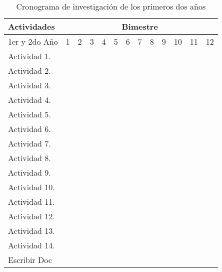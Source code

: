 \begin{table}[!htb]
  \centering
  \newcommand{\Bk}{\multicolumn{1}{G}{ }}
  \begin{tabular}{|p{3.0cm}||c|c|c|c|c|c|c|c|c|c|c|c|}\hline
    Actividades&\multicolumn{12}{|c|}{Bimestre}\\\hline\hline
    1er y  2do A\~no&1&2 &3  &4  &5  &6  &7  &8  &9  &10 &11 &12 \\\hline
    Actividad 1. &\Bk&   &   &   &   &\Bk&   &   &   &\Bk&   &   \\\hline
    Actividad 2. &\Bk&\Bk&   &   &\Bk&\Bk&   &\Bk&\Bk&\Bk&\Bk&\Bk\\\hline
    Actividad 3. &   &\Bk&   &   &\Bk&\Bk&   &\Bk&\Bk&\Bk&\Bk&\Bk\\\hline
    Actividad 4. &   &\Bk&   &   &   &\Bk&\Bk&\Bk&\Bk&\Bk&\Bk&\Bk\\\hline
    Actividad 5. &\Bk&   &   &\Bk&   &\Bk&   &   &   &\Bk&   &   \\\hline
    Actividad 6. &\Bk&   &   &\Bk&   &\Bk&   &   &   &\Bk&   &   \\\hline
    Actividad 7. &   &   &\Bk&\Bk&\Bk&   &\Bk&\Bk&\Bk&   &\Bk&\Bk\\\hline
    Actividad 8. &   &\Bk&   &\Bk&   &\Bk&   &   &   &\Bk&   &   \\\hline
    Actividad 9. &   &   &   &\Bk&   &   &\Bk&\Bk&\Bk&   &\Bk&\Bk\\\hline
    Actividad 10.&   &   &\Bk&\Bk&\Bk&   &\Bk&\Bk&\Bk&   &\Bk&\Bk\\\hline
    Actividad 11.&   &   &\Bk&\Bk&\Bk&   &\Bk&\Bk&\Bk&   &\Bk&\Bk\\\hline
    Actividad 12.&   &   &   &   &\Bk&   &   &\Bk&\Bk&   &\Bk&\Bk\\\hline
    Actividad 13.&   &   &   &   &   &   &   &   &   &   &   &   \\\hline
    Actividad 14.&   &   &   &   &   &   &   &   &   &   &   &   \\\hline
    Escribir Doc &   &\Bk&   &\Bk&   &\Bk&   &\Bk&   &\Bk&   &\Bk\\\hline    
  \end{tabular}
  \caption{Cronograma de investigaci\'on de los primeros dos a\~nos}
  \label{tab:crono}
\end{table}
